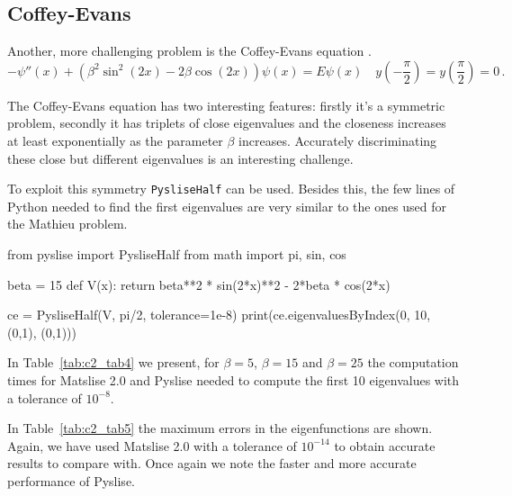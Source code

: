 \subsection{Coffey-Evans}\label{coffey-evans}


Another, more challenging problem is the Coffey-Evans equation \cite{pryce_error_1986}.
\begin{equation}
  -\psi''(x) + (\beta^2\sin^2(2x)-2\beta\cos(2x))\psi(x) = E\psi(x) \quad y(-\frac{\pi}{2})=y(\frac{\pi}{2})=0 \,. \label{ce}
\end{equation}

The Coffey-Evans equation has two interesting features: firstly it's a symmetric problem, secondly it has triplets of close eigenvalues and the closeness increases at least exponentially as the parameter $\beta$ increases. Accurately discriminating these close but different eigenvalues is an interesting challenge.

To exploit this symmetry \texttt{PysliseHalf} can be used. Besides this, the few lines of Python needed to find the first eigenvalues are very similar to the ones used for the Mathieu problem.

\begin{python}
  from pyslise import PysliseHalf
  from math import pi, sin, cos
  
  beta = 15
  def V(x):
    return beta**2 * sin(2*x)**2 - 2*beta * cos(2*x)
  
  ce = PysliseHalf(V, pi/2, tolerance=1e-8)
  print(ce.eigenvaluesByIndex(0, 10, (0,1), (0,1)))
\end{python}

In Table~\ref{tab:c2_tab4} we present, for $\beta=5$, $\beta=15$ and $\beta=25$ the computation times for Matslise 2.0 and Pyslise needed to compute the first 10 eigenvalues with a tolerance of $10^{-8}$.



In Table~\ref{tab:c2_tab5} the maximum errors in the eigenfunctions are shown. Again, we have used Matslise 2.0 with a tolerance of $10^{-14}$ to obtain accurate results to compare with.
Once again we note the faster and more accurate performance of Pyslise.

